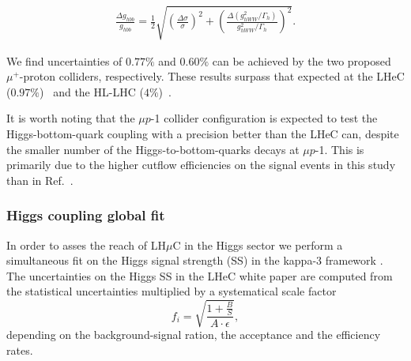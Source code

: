\documentclass[a4paper,11pt]{article}
\begin{document}
\begin{eqnarray}
\frac{\Delta g_{hbb}}{g_{hbb}}=\frac{1}{2}\sqrt{\left(\frac{\Delta\sigma}{\sigma}\right)^2+\left(  \frac{\Delta\left({g_{hWW}^2}/{\Gamma_h}\right)}{{g^2_{hWW}}/{\Gamma_h}}\right)^2}.
\end{eqnarray}

We find uncertainties of $0.77\%$ and $0.60\%$ can be achieved by the two proposed $\mu^+$-proton colliders, respectively.
These results surpass that expected at the LHeC ($0.97\%$)~\cite{lhecKappahbb} and the HL-LHC ($4\%$)~\cite{CMS:2013xfa,Cepeda:2019klc}.

It is worth noting that the $\mu p$-1 collider configuration is expected to test the Higgs-bottom-quark coupling with a precision better than the LHeC can, despite the smaller number of the Higgs-to-bottom-quarks decays at $\mu p$-1.
This is primarily due to the higher cutflow efficiencies on the signal events in this study than in Ref.~\cite{lhecKappahbb}.


\subsubsection{Higgs coupling global fit}

In order to asses the reach of LH$\mu$C in the Higgs sector we perform a simultaneous fit on the Higgs signal strength (SS) in the kappa-3 framework \cite{deBlas:2019rxi,deBlas:2022ofj}. The uncertainties on the Higgs SS in the LHeC white paper\cite{LHeC:2020van} are computed  from the statistical uncertainties multiplied by a systematical scale factor
\begin{equation}
   f_i = \sqrt{\frac{1+\frac{B}{S}}{A\cdot \epsilon} },
\end{equation}
depending on the background-signal ration, the acceptance and the efficiency rates.
\end{document}
